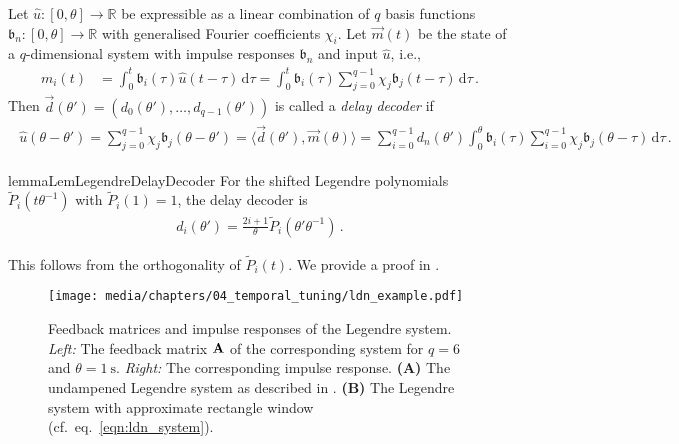\begin{definition}
\label{def:delay_decoder}
Let $\hat u : [0, \theta] \longrightarrow \mathbb{R}$ be expressible as a linear combination of $q$ basis functions $\mathfrak{b}_n : [0, \theta] \longrightarrow \mathbb{R}$ with generalised Fourier coefficients $\chi_i$.
Let $\vec m(t)$ be the state of a $q$-dimensional system with impulse responses $\mathfrak{b}_n$ and input $\hat u$, i.e.,
\begin{align*}
	m_i(t)
		&= \int_{0}^t \mathfrak{b}_i(\tau) \hat u(t - \tau) \,\mathrm{d}\tau
		 = \int_{0}^t \mathfrak{b}_i(\tau) \sum_{j = 0}^{q - 1} \chi_j \mathfrak{b}_j(t - \tau )\,\mathrm{d}\tau \,.
\end{align*}
Then $\vec d(\theta') = (d_0(\theta'), \ldots, d_{q - 1}(\theta'))$ is called a \emph{delay decoder} if
\begin{align}
	\begin{aligned}
	\hat u(\theta - \theta')
		 = \sum_{j = 0}^{q - 1} \chi_j \mathfrak{b}_j(\theta - \theta')
		 = \big\langle \vec d(\theta'), \vec m(\theta) \big\rangle
		 = \sum_{i = 0}^{q - 1} d_n(\theta') \int_{0}^\theta \mathfrak{b}_i(\tau) \sum_{i = 0}^{q - 1} \chi_j \mathfrak{b}_j(\theta - \tau )\,\mathrm{d}\tau \,.
	\end{aligned}
	\label{eqn:delay_decoder}
\end{align}
\end{definition}

\begin{restatable}{lemma}{LemLegendreDelayDecoder}%
	\label{lem:legendre_delay_decoder}%
	For the shifted Legendre polynomials $\tilde P_i(t \theta^{-1})$ with $\tilde P_i(1) = 1$, the delay decoder is
	\begin{align*}
		d_i(\theta') = \frac{2i + 1}{\theta} \tilde P_i(\theta' \theta^{-1}) \,.
	\end{align*}
\end{restatable}
\noindent This follows from the orthogonality of $\tilde P_i(t)$. We provide a proof in .

\begin{figure}
	\centering
	\texttt{[image: media/chapters/04\_temporal\_tuning/ldn\_example.pdf]}%
	{\label{fig:ldn_example_a}}%
	{\label{fig:ldn_example_b}}%
	\caption[Feedback matrices and impulse responses of the Legendre system]{Feedback matrices and impulse responses of the Legendre system.
	\emph{Left:} The feedback matrix $\mathbf{A}$ of the corresponding system for $q = 6$ and $\theta = \SI{1}{\second}$. \emph{Right:} The corresponding impulse response.
	\textbf{(A)} The undampened Legendre system as described in .
	\textbf{(B)} The Legendre system with approximate rectangle window (cf.~eq.~\ref{eqn:ldn_system}).
	}
	\label{fig:ldn_example}
\end{figure}

